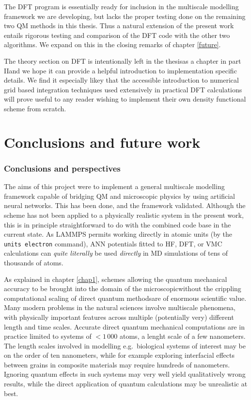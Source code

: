 \documentclass[twoside,english]{uiofysmaster}
\newcommand{\inlinecc}[1]{\lstinline[language={[std]c++}]{#1}}
\begin{document}
The DFT program is essentially ready for inclusion in the multiscale modelling framework we are developing, but lacks the proper testing done on the remaining two QM methods in this thesis. Thus a natural extension of the present work entails rigorous testing and comparison of the DFT code with the other two algorithms. We expand on this in the closing remarks of chapter \ref{future}.

The theory section on DFT is intentionally left in the thesis\textemdash as a chapter in part II\textemdash and we hope it can provide a helpful introduction to implementation specific details. We find it especially likey that the accessible introduction to numerical grid based integration techniques used extensively in practical DFT calculations will prove useful to any reader wishing to implement their own density functional scheme from scratch.






\part{Conclusions and future work \label{future}}
\section{Conclusions and perspectives}
The aims of this project were to implement a general multiscale modelling framework capable of bridging QM and microscopic physics by using artificial neural networks. This has been done, and the framework validated. Although the scheme has not been applied to a physically realistic system in the present work, this is in principle straightforward to do with the combined code base in the current state. As LAMMPS permits working directly in atomic units (by the \inlinecc{units electron} command), ANN potentials fitted to HF, DFT, or VMC calculations can \emph{quite literally} be used \emph{directly} in MD simulations of tens of thousands of atoms. 

As explained in chapter \ref{chap1}, schemes allowing the quantum mechanical accuracy to be brought into the domain of the microscopic\textemdash without the crippling computational scaling of direct quantum methods\textemdash are of enormous scientific value. Many modern problems in the natural sciences involve multiscale phenomena, with physically important features across multiple (potentially very) different length and time scales. Accurate direct quantum mechanical computations are in practice limited to systems of $<1\,000$ atoms, a lenght scale of a few nanometers. The length scales involved in modelling e.g.\ biological systems of interest may be on the order of ten nanometers, while for example exploring interfacial effects between grains in composite materials may require hundreds of nanometers. Ignoring quantum effects in such systems may very well yield qualitatively wrong results, while the direct application of quantum calculations may be unrealistic at best. 
\end{document}
